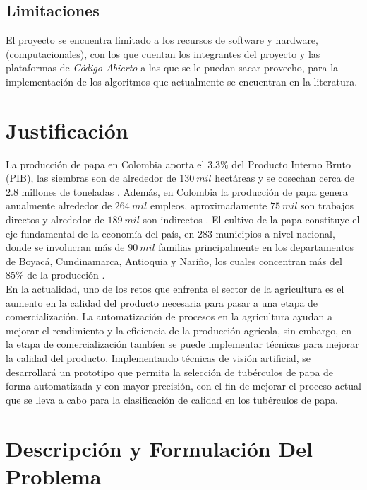 \subsection{Limitaciones}


El proyecto se encuentra limitado a los recursos de software y hardware, (computacionales), con los que cuentan los integrantes del proyecto y las plataformas de \textit{Código Abierto} a las que se le puedan sacar provecho, para la implementación de los algoritmos que actualmente se encuentran en la literatura.

\section{Justificación}

La producción de papa en Colombia aporta el $3.3 \%$ del Producto Interno Bruto (PIB), las siembras son de alrededor de $130 \ mil$ hectáreas y se cosechan cerca de $2.8$ millones de toneladas \cite{avellaneda2021evaluacion}. Además, en Colombia la producción de papa genera anualmente alrededor de $264 \ mil$ empleos, aproximadamente $75 \ mil$ son trabajos directos y alrededor de $189 \ mil$ son indirectos \cite{referencia2}. El cultivo de la papa constituye el eje fundamental de la economía del país, en $283$ municipios a nivel nacional, donde se involucran más de $90 \ mil$ familias principalmente en los departamentos de Boyacá, Cundinamarca, Antioquia y Nariño, los cuales concentran más del $85 \%$ de la producción \cite{referencia1}.\\

En la actualidad, uno de los retos que enfrenta el sector de la agricultura es el aumento en la calidad del producto necesaria para pasar a una etapa de comercialización. La automatización de procesos en la agricultura ayudan a mejorar el rendimiento y la eficiencia  de la producción agrícola, sin embargo, en la etapa de comercialización tambíen se puede implementar técnicas para mejorar la calidad del producto. Implementando técnicas de visión artificial, se desarrollará un prototipo que permita la selección de tubérculos de papa de forma automatizada y con mayor precisión, con el fin de mejorar el proceso actual que se lleva a cabo para la clasificación de calidad en los tubérculos de papa.


\section{Descripción y Formulación Del Problema}

